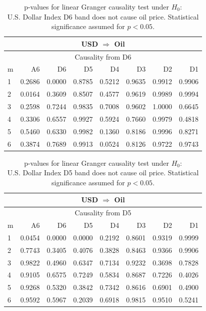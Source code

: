 %
%
\begin{table}[H]
\begin{center}
\begin{tabular}{l|r r r r r r r}
\hline\hline
\multicolumn{8}{c}{USD $\Rightarrow$ Oil}\\
\hline
\multicolumn{8}{c}{Causality from D6}\\
\hline\hline
m & A6 & D6 & D5 & D4 & D3 & D2 & D1 \\
\hline
1 & 0.2686 & \cellcolor{mygreen}0.0000 & 0.8785 & 0.5212 & 0.9635 & 0.9912 & 0.9906 \\
2 & \cellcolor{mygreen}0.0164 & 0.3609 & 0.8507 & 0.4577 & 0.9619 & 0.9989 & 0.9994 \\
3 & 0.2598 & 0.7244 & 0.9835 & 0.7008 & 0.9602 & 1.0000 & 0.6645 \\
4 & 0.3306 & 0.6557 & 0.9927 & 0.5924 & 0.7660 & 0.9979 & 0.4818 \\
5 & 0.5460 & 0.6330 & 0.9982 & 0.1360 & 0.8186 & 0.9996 & 0.8271 \\
6 & 0.3874 & 0.7689 & 0.9913 & 0.0524 & 0.8126 & 0.9722 & 0.9743 \\
\hline\hline
\end{tabular}
\caption{p-values for linear Granger causality test under $H_0$:\\
U.S. Dollar Index D6 band does not cause oil price. Statistical significance assumed for $p<0.05$.}
\end{center}
\end{table}

%
%
\begin{table}[H]
\begin{center}
\begin{tabular}{l|r r r r r r r}
\hline\hline
\multicolumn{8}{c}{USD $\Rightarrow$ Oil}\\
\hline
\multicolumn{8}{c}{Causality from D5}\\
\hline\hline
m & A6 & D6 & D5 & D4 & D3 & D2 & D1 \\
\hline
1 & \cellcolor{mygreen}0.0454 & \cellcolor{mygreen}0.0000 & \cellcolor{mygreen}0.0000 & 0.2192 & 0.8601 & 0.9319 & 0.9999 \\
2 & 0.7743 & 0.3405 & 0.4076 & 0.3828 & 0.8463 & 0.9366 & 0.9906 \\
3 & 0.9822 & 0.4960 & 0.6347 & 0.7134 & 0.9232 & 0.3698 & 0.7828 \\
4 & 0.9105 & 0.6575 & 0.7249 & 0.5834 & 0.8687 & 0.7226 & 0.4026 \\
5 & 0.9268 & 0.5320 & 0.3842 & 0.7342 & 0.8616 & 0.6901 & 0.4900 \\
6 & 0.9592 & 0.5967 & 0.2039 & 0.6918 & 0.9815 & 0.9510 & 0.5241 \\
\hline\hline
\end{tabular}
\caption{p-values for linear Granger causality test under $H_0$:\\
U.S. Dollar Index D5 band does not cause oil price. Statistical significance assumed for $p<0.05$.}
\end{center}
\end{table}

